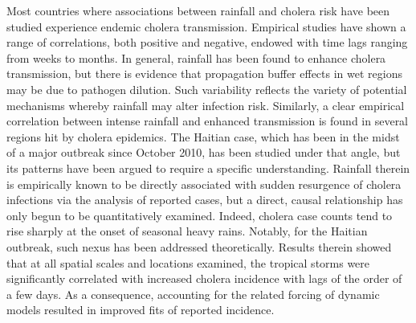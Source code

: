 Most countries where associations between rainfall and cholera risk have been studied experience endemic cholera transmission\cite{Rinaldo:ModelingKeyDrivers:2017}. Empirical studies have shown a range of correlations, both positive and negative, endowed with time lags ranging from weeks to months\cite{Ruiz-Moreno:CholeraSeasonalityMadras:2007,Emch:SeasonalityCholera1974:2008,Magny:CholeraOutbreakSenegal:2012}. In general, rainfall has been found to enhance cholera transmission, but there is evidence that propagation buffer effects in wet regions may be due to pathogen dilution\cite{Ruiz-Moreno:CholeraSeasonalityMadras:2007}. Such variability reflects the variety of potential mechanisms whereby rainfall may alter infection risk. Similarly, a clear empirical correlation between intense rainfall and enhanced transmission is found in several regions hit by cholera epidemics\cite{Magny:EnvironmentalSignaturesAssociated:2008,Rebaudet:EnvironmentalDeterminantsCholera:2013,Rebaudet:CholeraCoastalAfrica:2013,Jutla:WaterMarkerMonitored:2013,Gaudart:SpatioTemporalDynamicsCholera:2013}. The Haitian case, which has been in the midst of a major outbreak since October 2010\cite{Frerichs:NepaleseOriginCholera:2012,Gaudart:SpatioTemporalDynamicsCholera:2013,Kirpich:CholeraTransmissionOuest:2015,ERCCECHO:HaitiHurricaneMatthew:2016,Camacho:PredictionCholeraDynamics:2016,Pasetto:RealtimeProjectionsCholera:2017,Khan:AssessmentRiskCholera:2017}, has been studied under that angle, but its patterns have been argued to require a specific understanding\cite{Piarroux:UnderstandingCholeraEpidemic:2011}. Rainfall therein is empirically known to be directly associated with sudden resurgence of cholera infections via the analysis of reported cases\cite{Gaudart:SpatioTemporalDynamicsCholera:2013}, but a direct, causal relationship has only begun to be quantitatively examined\cite{Rinaldo:Reassessment20102011:2012,Eisenberg:ExaminingRainfallCholera:2013,Bertuzzo:ProbabilityExtinctionHaiti:2016}. Indeed, cholera case counts tend to rise sharply at the onset of seasonal heavy rains\cite{Adams:HaitiPreparesCholera:2012,Periago:EliminationCholeraTransmission:12,Adams:CholeraHaitiTakes:2013}. Notably, for the Haitian outbreak, such nexus has been addressed theoretically\cite{Rinaldo:Reassessment20102011:2012,Eisenberg:ExaminingRainfallCholera:2013}. Results therein showed that at all spatial scales and locations examined, the tropical storms were significantly correlated with increased cholera incidence with lags of the order of a few days. As a consequence, accounting for the related forcing of dynamic models resulted in improved fits of reported incidence. 


